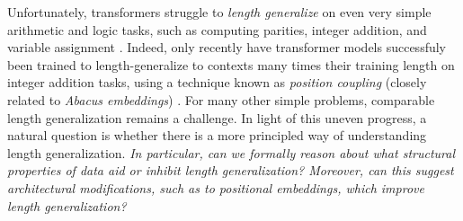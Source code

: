 \documentclass{article}
\newcommand{\icml}[1]{\iftoggle{icml}{#1}{}}
\begin{document}
Unfortunately, transformers struggle to \emph{length generalize} on even very simple arithmetic and logic tasks, such as computing parities, integer addition, and variable assignment \cite{anil_exploring_2022,kazemnejad_impact_2023}. Indeed, only recently have transformer models successfuly been trained to length-generalize to contexts many times their training length on integer addition tasks, using a technique known as \emph{position coupling} (closely related to \emph{Abacus embeddings}) \cite{cho_position_2024,cho_arithmetic_2024,mcleish_transformers_2024}. For many other simple problems, comparable length generalization remains a challenge. In light of this uneven progress, a natural question is whether there is a more principled way of understanding length generalization. \emph{In particular, can we formally reason about what structural properties of data aid or inhibit length generalization? Moreover, can this suggest architectural modifications, such as to positional embeddings, which improve length generalization?}

\icml{\vspace{-0.2cm}}
\end{document}
